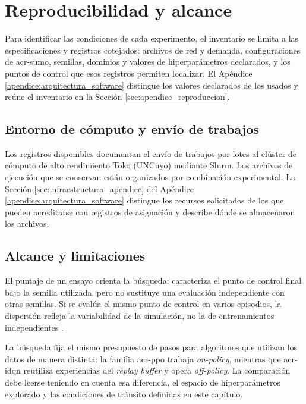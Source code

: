 \FloatBarrier

\section{Reproducibilidad y alcance}
\label{sec:reproducibilidad_validez}

Para identificar las condiciones de cada experimento, el inventario se limita a las especificaciones y registros cotejados: archivos de red y demanda, configuraciones de \acrshort{acr-sumo}, semillas, dominios y valores de hiperparámetros declarados, y los puntos de control que esos registros permiten localizar. El Apéndice \ref{apendice:arquitectura_software} distingue los valores declarados de los usados y reúne el inventario en la Sección \ref{sec:apendice_reproduccion}.

\subsection{Entorno de cómputo y envío de trabajos}
\label{subsec:infraestructura_hpc}

Los registros disponibles documentan el envío de trabajos por lotes al clúster de cómputo de alto rendimiento Toko (UNCuyo) mediante Slurm. Los archivos de ejecución que se conservan están organizados por combinación experimental. La Sección \ref{sec:infraestructura_apendice} del Apéndice \ref{apendice:arquitectura_software} distingue los recursos solicitados de los que pueden acreditarse con registros de asignación y describe dónde se almacenaron los archivos.

\subsection{Alcance y limitaciones}
\label{subsec:alcance_limitaciones}

El puntaje de un ensayo orienta la búsqueda: caracteriza el punto de control final bajo la semilla utilizada, pero no sustituye una evaluación independiente con otras semillas. Si se evalúa el mismo punto de control en varios episodios, la dispersión refleja la variabilidad de la simulación, no la de entrenamientos independientes \cite{Agarwal2021RLiable}.

La búsqueda fija el mismo presupuesto de pasos para algoritmos que utilizan los datos de manera distinta: la familia \acrshort{acr-ppo} trabaja \textit{on-policy}, mientras que \acrshort{acr-idqn} reutiliza experiencias del \textit{replay buffer} y opera \textit{off-policy}. La comparación debe leerse teniendo en cuenta esa diferencia, el espacio de hiperparámetros explorado y las condiciones de tránsito definidas en este capítulo.

